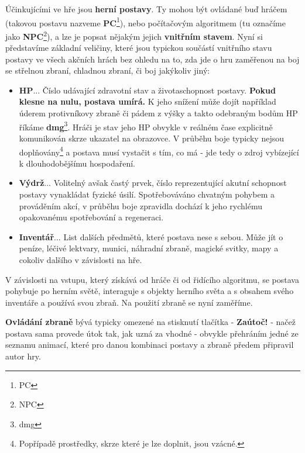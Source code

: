 Účinkujícími ve hře jsou \textbf{herní postavy}. Ty mohou být ovládané buď hráčem (takovou postavu nazveme \textbf{\acs{PC}}\footnote{\Acl{PC}}), nebo počítačovým algoritmem (tu označíme jako \textbf{\acs{NPC}}\footnote{\Acl{NPC}}), a lze je popsat nějakým jejich \textbf{vnitřním stavem}. Nyní si představíme základní veličiny, které jsou typickou součástí vnitřního stavu postavy ve všech akčních hrách bez ohledu na to, zda jde o hru zaměřenou na boj se střelnou zbraní, chladnou zbraní, či boj jakýkoliv jiný:

\begin{itemize}
    \item \textbf{\ac{HP}}... \linebreak Číslo udávající zdravotní stav a životaschopnost postavy. \textbf{Pokud klesne na nulu, postava umírá.} K jeho snížení může dojít například úderem protivníkovy zbraně či pádem z výšky a takto odebraným bodům HP říkáme \textbf{\acs{dmg}}\footnote{\Acl{dmg}}. Hráči je stav jeho HP obvykle v reálném čase explicitně komunikován skrze ukazatel na obrazovce. V průběhu boje typicky nejsou doplňovány\footnote{Popřípadě prostředky, skrze které je lze doplnit, jsou vzácné.} a postava musí vystačit s tím, co má - jde tedy o zdroj vybízející k dlouhodobějšímu hospodaření.
    \item \textbf{Výdrž}... Volitelný avšak častý prvek, číslo reprezentující akutní schopnost postavy vynakládat fyzické úsilí. Spotřebováváno chvatným pohybem a prováděním akcí, v průběhu boje zpravidla dochází k jeho rychlému opakovanému spotřebování a regeneraci.
    \item \textbf{Inventář}... List dalších předmětů, které postava nese s sebou. Může jít o peníze, léčivé lektvary, munici, náhradní zbraně, magické svitky, mapy a cokoliv dalšího v závislosti na hře. 
\end{itemize}

V závislosti na vstupu, který získává od hráče či od řidícího algoritmu, se postava pohybuje po herním světě, interaguje s objekty herního světa a s obsahem svého inventáře a používá svou zbraň. Na použití zbraně se nyní zaměříme.

\textbf{Ovládání zbraně} bývá typicky omezené na stisknutí tlačítka - \textbf{Zaútoč!} - načež postava sama provede útok tak, jak uzná za vhodné - obvykle přehráním jedné ze seznamu animací, které pro danou kombinaci postavy a zbraně předem připravil autor hry.

